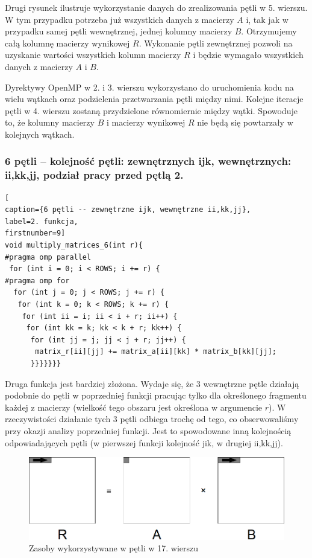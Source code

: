 \documentclass{article}
\begin{document}
Drugi rysunek ilustruje wykorzystanie danych do zrealizowania pętli w 5. wierszu. W tym przypadku potrzeba już wszystkich danych z macierzy $A$ i, tak jak w przypadku samej pętli wewnętrznej, jednej kolumny macierzy $B$. Otrzymujemy całą kolumnę macierzy wynikowej $R$. Wykonanie pętli zewnętrznej pozwoli na uzyskanie wartości wszystkich kolumn macierzy $R$ i będzie wymagało wszystkich danych z macierzy $A$ i $B$.

Dyrektywy OpenMP w 2. i 3. wierszu wykorzystano do uruchomienia kodu na wielu wątkach oraz podzielenia przetwarzania pętli między nimi. Kolejne iteracje pętli w 4. wierszu zostaną przydzielone równomiernie między wątki. Spowoduje to, że kolumny macierzy $B$ i macierzy wynikowej $R$ nie będą się powtarzały w kolejnych wątkach.

\subsubsection{6 pętli -- kolejność pętli: zewnętrznych ijk, wewnętrznych: ii,kk,jj, podział pracy przed pętlą 2.}
\begin{lstlisting}[
caption={6 pętli -- zewnętrzne ijk, wewnętrzne ii,kk,jj},
label=2. funkcja,
firstnumber=9]
void multiply_matrices_6(int r){
#pragma omp parallel
 for (int i = 0; i < ROWS; i += r) {
#pragma omp for
  for (int j = 0; j < ROWS; j += r) {
   for (int k = 0; k < ROWS; k += r) {
    for (int ii = i; ii < i + r; ii++) {
     for (int kk = k; kk < k + r; kk++) {
      for (int jj = j; jj < j + r; jj++) {
       matrix_r[ii][jj] += matrix_a[ii][kk] * matrix_b[kk][jj];
      }}}}}}}
\end{lstlisting}

Druga funkcja jest bardziej złożona. Wydaje się, że 3 wewnętrzne pętle działają podobnie do pętli w poprzedniej funkcji pracując tylko dla określonego fragmentu każdej z macierzy (wielkość tego obszaru jest określona w argumencie $r$). W rzeczywistości działanie tych 3 pętli odbiega trochę od tego, co obserwowaliśmy przy okazji analizy poprzedniej funkcji. Jest to spowodowane inną kolejnością odpowiadających pętli (w pierwszej funkcji kolejność jik, w drugiej ii,kk,jj).

\begin{figure}[H]
	\centering
	\includegraphics[width=\linewidth]{./images/6/lokIn1.png}
	\caption{Zasoby wykorzystywane w pętli w 17. wierszu}
	\label{fig:6inner1}
\end{figure}
\end{document}
